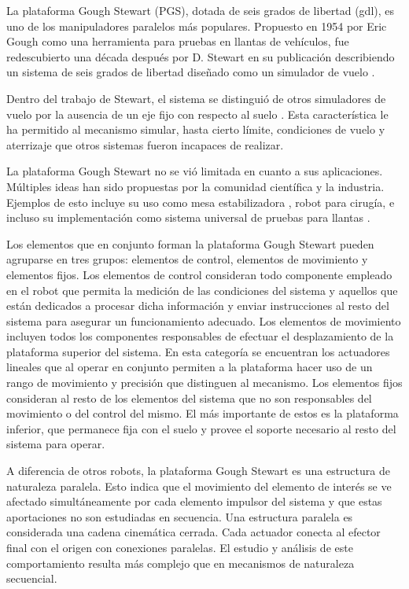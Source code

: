 La plataforma Gough Stewart (PGS), dotada de seis grados de 
libertad (gdl), es uno de los manipuladores paralelos más 
populares. Propuesto en 1954 por Eric Gough \cite{pretoria} 
como una herramienta para pruebas en llantas de 
vehículos\cite{gough}, fue redescubierto una década después 
por D. Stewart en su publicación describiendo un sistema de 
seis grados de libertad diseñado como un simulador de vuelo 
\cite{stewart}.

Dentro del trabajo de Stewart, el sistema se distinguió de 
otros simuladores de vuelo por la ausencia de un eje fijo 
con respecto al suelo \cite{stewart}. Esta característica le 
ha permitido al mecanismo simular, hasta cierto límite, 
condiciones de vuelo y aterrizaje que otros sistemas fueron 
incapaces de realizar.

La plataforma Gough Stewart no se vió limitada en cuanto a 
sus aplicaciones. Múltiples ideas han sido propuestas por la 
comunidad científica y la industria. Ejemplos de esto 
incluye su uso como mesa estabilizadora \cite{pretoria}, 
robot para cirugía, e incluso su implementación como sistema 
universal de pruebas para llantas \cite{gough2}.

Los elementos que en conjunto forman la plataforma Gough 
Stewart pueden agruparse en tres grupos: elementos de 
control, elementos de movimiento y elementos fijos. Los 
elementos de control consideran todo componente empleado en 
el robot que permita la medición de las condiciones del 
sistema y aquellos que están dedicados a procesar dicha 
información y enviar instrucciones al resto del sistema para 
asegurar un funcionamiento adecuado. Los elementos de 
movimiento incluyen todos los componentes responsables de 
efectuar el desplazamiento de la plataforma superior del 
sistema. En esta categoría se encuentran los actuadores 
lineales que al operar en conjunto permiten a la plataforma
hacer uso de un rango de movimiento y precisión 
que distinguen al mecanismo. Los elementos fijos consideran
al resto de los elementos del sistema que no son responsables
del movimiento o del control del mismo. El más importante de
estos es la plataforma inferior, que permanece fija con 
el suelo y provee el soporte necesario al resto del sistema
para operar.

A diferencia de otros robots, la plataforma Gough Stewart 
es una estructura de naturaleza paralela. 
Esto indica que el movimiento del elemento de interés se
ve afectado simultáneamente por cada elemento impulsor 
del sistema y que estas aportaciones no son estudiadas en
secuencia. Una estructura paralela es considerada una cadena 
cinemática cerrada. Cada actuador conecta al efector final
con el origen con conexiones paralelas. 
El estudio y análisis de este comportamiento resulta más 
complejo que en mecanismos de naturaleza secuencial.

